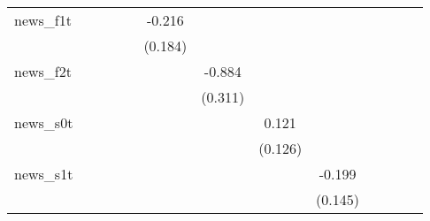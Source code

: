 {\begin{tabular}{l*{12}{c}}
\addlinespace
news\_f1t    &                     &                     &                     &                     &      -0.216         &                     &                     &                     &                     &                     &                     &                     \\
            &                     &                     &                     &                     &     (0.184)         &                     &                     &                     &                     &                     &                     &                     \\
\addlinespace
news\_f2t    &                     &                     &                     &                     &                     &      -0.884\sym{***}&                     &                     &                     &                     &                     &                     \\
            &                     &                     &                     &                     &                     &     (0.311)         &                     &                     &                     &                     &                     &                     \\
\addlinespace
news\_s0t    &                     &                     &                     &                     &                     &                     &       0.121         &                     &                     &                     &                     &                     \\
            &                     &                     &                     &                     &                     &                     &     (0.126)         &                     &                     &                     &                     &                     \\
\addlinespace
news\_s1t    &                     &                     &                     &                     &                     &                     &                     &      -0.199         &                     &                     &                     &                     \\
            &                     &                     &                     &                     &                     &                     &                     &     (0.145)         &                     &                     &                     &                     \\

\end{tabular}}

